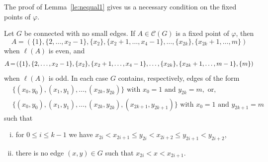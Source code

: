 \documentclass[ALCO,ThmDefs,Unicode,epreuves]{cedram}
\newcommand*{\Mk}{\mkern -2mu}
\begin{document}
The proof of Lemma~\ref{le:nequal1} gives us a necessary condition on the fixed points of $\varphi$.

\begin{lemma}\label{le:fixshape} Let $G$ be connected with no small edges.
 If $A\in \mathcal{C}(G)$ is a fixed point of $\varphi$, then 
 $$
 A=(\{{1}\},\{2,\ldots,x_2-1\},\{x_2\},\{x_2+1,\ldots,x_4-1\},\ldots,\{x_{2k}\},\{x_{2k}+1,\ldots,m\})
 $$
 when $\ell(A)$ is even, and
 $$
 A\Mk = \Mk (\{1\},\{2,\ldots,x_2-1\},\{x_2\},\{x_2+1,\ldots,x_4-1\},\ldots,\{x_{2k}\},\{x_{2k}+1,\ldots,m-1\},\{m\})
 $$ 
when $\ell(A)$ is odd. In each case $G$ contains, respectively, edges of the form
\begin{align*}
& \big\{(x_0,y_0),(x_1,y_1),\ldots,(x_{2k},y_{2k})\big\}\text{ with }x_0=1 \text{ and }y_{2k} = m,\text{ or},\\
 &\big\{(x_0,y_0),(x_1,y_1),\ldots,(x_{2k},y_{2k}),(x_{2k+1},y_{2k+1})\big\}\text{ with }x_0=1 \text{ and }y_{2k+1} = m
 \end{align*}
 such that 
 \begin{enumerate}[(i)]
 \item %
\label{lemma2.12_i} for $0\le i\le k-1$ we have $x_{2i}<x_{2i+1}\le y_{2i}<x_{2i+2}\le y_{2i+1}<y_{2i+2}$,
 \item %
\label{lemma2.12_ii} there is no edge $(x,y)\in G$ such that $x_{2i}<x<x_{2i+1}$.
 \end{enumerate}
\end{lemma}
\end{document}
